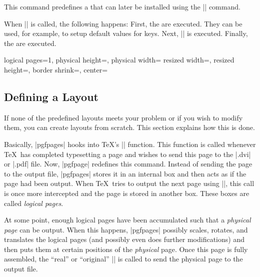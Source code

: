 \begin{command}{\pgfdefpagelayout{}}
  This command predefines a  that can later be installed
  using the |\pgfpagelayout| command.

  When |\pgfpagelayout| is called, the
  following happens: First, the  are
  executed. They can be used, for example, to setup default values for
  keys. Next, || is
  executed. Finally, the  are executed.

\begin{codeexample}
{
  \def\pgfpageoptionborder{0pt}
}
{
  \pgfpagesoptions
  {%
    logical pages=1,%
    physical height=\pgfpageoptionheight,%
    physical width=\pgfpageoptionwidth%
  }
  {%
    resized width=\pgfphysicalwidth,%
    resized height=\pgfphysicalheight,%
    border shrink=\pgfpageoptionborder,%
    center=\pgfpoint{.5\pgfphysicalwidth}{.5\pgfphysicalheight}%
  }%
}
\end{codeexample}
\end{command}




\subsection{Defining a Layout}

If none of the predefined layouts meets your problem or if you wish to
modify them, you can create layouts from scratch. This section
explains how this is done.

Basically, |pgfpages| hooks into \TeX's |\shipout| function. This
function is called whenever \TeX\ has completed typesetting a page and
wishes to send this page to the |.dvi| or |.pdf| file. Now, |pgfpage|
redefines this command. Instead of sending the page to the output
file, |pgfpages| stores it in an internal box and then acts as if the
page had been output. When \TeX\ tries to output the next page using
|\shipout|, this call is once more intercepted and the page is stored
in another box. These boxes are called \emph{logical pages}.

At some point, enough logical pages have been accumulated such that a
\emph{physical page} can be output. When this happens, |pgfpages|
possibly scales, rotates, and translates the logical pages (and
possibly even does further modifications) and then puts them at
certain positions of the \emph{physical} page. Once this page is fully
assembled, the ``real'' or ``original'' |\shipout| is called to
send the physical page to the output file.

